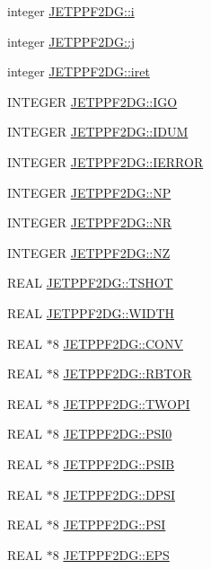 \begin{CompactItemize}
integer \hyperlink{namespaceJETPPF2DG_cd9af8b5846f3015549a65dac27297d6}{JETPPF2DG::i}
\item 
integer \hyperlink{namespaceJETPPF2DG_8b427254180dae4e03e464db25432b89}{JETPPF2DG::j}
\item 
integer \hyperlink{namespaceJETPPF2DG_8a10d0fb8a6fcf0b1735d5264e4074c6}{JETPPF2DG::iret}
\item 
INTEGER \hyperlink{namespaceJETPPF2DG_6fcf8fd1ddd7d7d89f9ebc42bb0acd4d}{JETPPF2DG::IGO}
\item 
INTEGER \hyperlink{namespaceJETPPF2DG_525296fd37a70f64b96687ac65d85e15}{JETPPF2DG::IDUM}
\item 
INTEGER \hyperlink{namespaceJETPPF2DG_7d9dd11fba52d0b1b824c1d55e435c0f}{JETPPF2DG::IERROR}
\item 
INTEGER \hyperlink{namespaceJETPPF2DG_fc3e107505ebc9c764214d171a22c579}{JETPPF2DG::NP}
\item 
INTEGER \hyperlink{namespaceJETPPF2DG_177fa052b15bf74d1b04fa4c6d0d246d}{JETPPF2DG::NR}
\item 
INTEGER \hyperlink{namespaceJETPPF2DG_54b52cca10f228100e5bf6d6861b5744}{JETPPF2DG::NZ}
\item 
REAL \hyperlink{namespaceJETPPF2DG_40cdb8daca293ee227018204f477a568}{JETPPF2DG::TSHOT}
\item 
REAL \hyperlink{namespaceJETPPF2DG_eeb6ada756a20d433b90d04807324eec}{JETPPF2DG::WIDTH}
\item 
REAL $\ast$8 \hyperlink{namespaceJETPPF2DG_cc9d3570fc86b09342a8977a84c9b1e6}{JETPPF2DG::CONV}
\item 
REAL $\ast$8 \hyperlink{namespaceJETPPF2DG_54f18c6794b7739b7bc332cedd97d7f1}{JETPPF2DG::RBTOR}
\item 
REAL $\ast$8 \hyperlink{namespaceJETPPF2DG_0071ea355e749981556deb6108904af9}{JETPPF2DG::TWOPI}
\item 
REAL $\ast$8 \hyperlink{namespaceJETPPF2DG_0aea03eeb6f87047b94e1a0b718253af}{JETPPF2DG::PSI0}
\item 
REAL $\ast$8 \hyperlink{namespaceJETPPF2DG_e557339a1c12ba7e9ef7deadc7465739}{JETPPF2DG::PSIB}
\item 
REAL $\ast$8 \hyperlink{namespaceJETPPF2DG_fbb4fcc942fe28a23b23a8667d562b48}{JETPPF2DG::DPSI}
\item 
REAL $\ast$8 \hyperlink{namespaceJETPPF2DG_b093dcbbe39feeaa433796831d6374de}{JETPPF2DG::PSI}
\item 
REAL $\ast$8 \hyperlink{namespaceJETPPF2DG_9bcf5731b1080d6e8a268dc44d2c30a0}{JETPPF2DG::EPS}
\item 

\end{CompactItemize}
